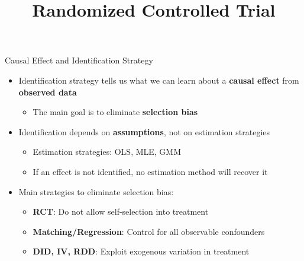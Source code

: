 \documentclass[hyperref={pdfpagelabels=false}]{beamer}
\begin{document}
	\begin{frame}{Causal Effect and Identification Strategy}
		\begin{itemize}
			\item Identification strategy tells us what we can learn about a \textbf{causal effect} from \textbf{observed data}
			\vspace{0.2cm}
			\begin{itemize}
				\item The main goal is to eliminate \textbf{selection bias}
			\end{itemize}
			\vspace{0.2cm}
			\item Identification depends on \textbf{assumptions}, not on estimation strategies
			\vspace{0.2cm}
			\begin{itemize}
				\item Estimation strategies: OLS, MLE, GMM
				\vspace{0.2cm}
				\item If an effect is not identified, no estimation method will recover it
			\end{itemize}
			\vspace{0.2cm}
			\item Main strategies to eliminate selection bias:
			\vspace{0.2cm}
			\begin{itemize}
				\item \textbf{RCT}: Do not allow self-selection into treatment
				\vspace{0.1cm}
				\item \textbf{Matching/Regression}: Control for all observable confounders
				\vspace{0.1cm}
				\item \textbf{DID, IV, RDD}: Exploit exogenous variation in treatment
			\end{itemize}
		\end{itemize}
	\end{frame}
	
	
	

\title[]  
{Randomized Controlled Trial}


\author 
{}

\institute{}
\end{document}
